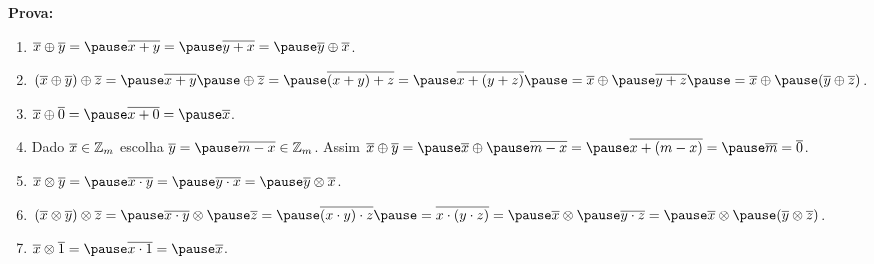 \documentclass{beamer}
\begin{document}
    \begin{frame}
        \noindent \textbf{Prova: }
            \begin{enumerate}[label={\roman*})]
                \item \pause $\overline{x} \oplus \overline{y} = \pause \overline{x + y} = \pause \overline{y + x} = \pause \overline{y} \oplus \overline{x}$. \vspace{.2cm} \pause
                
                \item \pause $(\overline{x} \oplus \overline{y}) \oplus \overline{z} = \pause \overline{x + y} \pause \oplus \overline{z} = \pause \overline{(x + y) + z} = \pause \overline{x + (y + z)} \pause = \overline{x} \oplus \pause \overline{y + z}\pause  = \overline{x} \oplus \pause (\overline{y} \oplus \overline{z})$. \vspace{.2cm} \pause

                \item \pause $\overline{x} \oplus \overline{0} = \pause \overline{x + 0} = \pause \overline{x}$. \vspace{.2cm} \pause

                \item \pause Dado $\overline{x} \in \mathbb{Z}_m$ \pause escolha $\overline{y} = \pause \overline{m - x} \in \z_m$. \pause Assim $\overline{x} \oplus \overline{y} = \pause \overline{x} \oplus \pause \overline{m - x} = \pause \overline{x + (m - x)} = \pause \overline{m} = \overline{0}$. \vspace{.2cm} \pause

                \item \pause $\overline{x} \otimes \overline{y} = \pause \overline{x \cdot y} = \pause \overline{y \cdot x} = \pause \overline{y} \otimes \overline{x}$. \vspace{.2cm} \pause

                \item \pause $(\overline{x} \otimes \overline{y}) \otimes \overline{z} = \pause \overline{x \cdot y} \otimes \pause \overline{z} = \pause \overline{(x \cdot y)\cdot z} \pause = \overline{x\cdot(y \cdot z)} = \pause \overline{x} \otimes \pause \overline{y \cdot z} = \pause \overline{x} \otimes \pause (\overline{y}\otimes \overline{z})$. \vspace{.2cm} \pause

                \item \pause $\overline{x} \otimes \overline{1} = \pause \overline{x \cdot 1} = \pause \overline{x}$. \pause
            \end{enumerate}
        \qedsymbol
    \end{frame}
\end{document}
